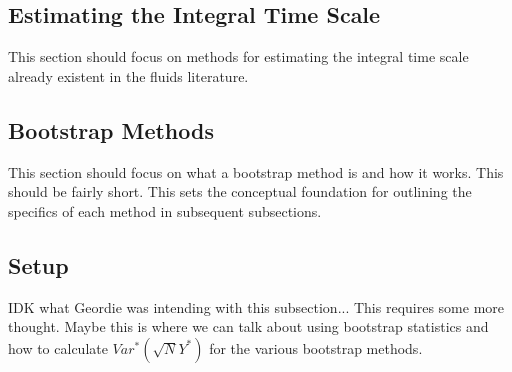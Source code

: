 \documentclass[onecolumn,12pt]{iopart}
\begin{document}
\subsection{Estimating the Integral Time Scale}
This section should focus on methods for estimating the integral time scale already existent in the fluids literature.
%


\subsection{Bootstrap Methods}
This section should focus on what a bootstrap method is and how it works. This should be fairly short. This sets the conceptual foundation for outlining the specifics of each method in subsequent subsections.



\subsection{Setup}
IDK what Geordie was intending with this subsection... This requires some more thought. Maybe this is where we can talk about using bootstrap statistics and how to calculate $Var^*(\sqrt{N} Y^*)$ for the various bootstrap methods.
\end{document}
